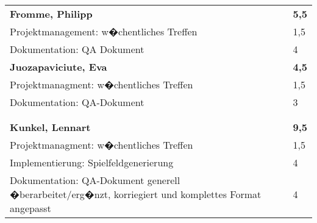 \documentclass[a4paper,11pt]{scrartcl}
\begin{document}
\begin{longtable}{| p{13.8cm} | C{2.4cm} |}
	\\
	\hline


	&

	\\
	\hline
	\hline


	\textbf{Fromme, Philipp} & \textbf{5,5}\\ %
	\hline

	Projektmanagement: w�chentliches Treffen
	&
	1,5
	\\
	\hline

  Dokumentation: QA Dokument
	&
  4
	\\
	\hline
	\hline


	\textbf{Juozapaviciute, Eva} & \textbf{4,5}\\ %
	\hline

  Projektmanagment: w�chentliches Treffen
	&
  1,5
	\\
	\hline

  Dokumentation: QA-Dokument
	&
  3
	\\
	\hline


	&

	\\
	\hline


	&

	\\
	\hline
	\hline


	\textbf{Kunkel, Lennart} & \textbf{9,5}\\ %
	\hline

  Projektmanagment: w�chentliches Treffen
	&
  1,5
	\\
	\hline

  Implementierung: Spielfeldgenerierung
	&
  4
	\\
	\hline

  Dokumentation: QA-Dokument generell �berarbeitet/erg�nzt, korriegiert und komplettes Format angepasst
	&
  4
	\\
	\hline


\end{longtable}
\end{document}
